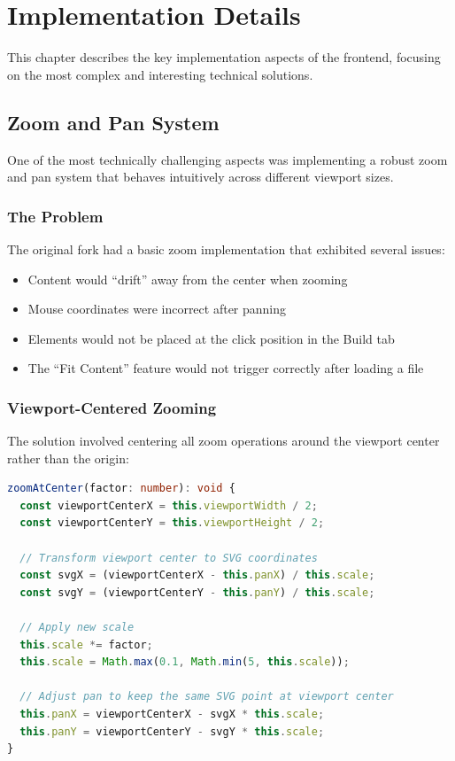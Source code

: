 \chapter{Implementation Details}
\label{chap:implementation}

This chapter describes the key implementation aspects of the frontend, focusing on the most complex and interesting technical solutions.

\section{Zoom and Pan System}
\label{sec:zoom-pan-system}

One of the most technically challenging aspects was implementing a robust zoom and pan system that behaves intuitively across different viewport sizes.

\subsection{The Problem}

The original fork had a basic zoom implementation that exhibited several issues:
\begin{itemize}
    \item Content would ``drift'' away from the center when zooming
    \item Mouse coordinates were incorrect after panning
    \item Elements would not be placed at the click position in the Build tab
    \item The ``Fit Content'' feature would not trigger correctly after loading a file
\end{itemize}

\subsection{Viewport-Centered Zooming}

The solution involved centering all zoom operations around the viewport center rather than the origin:

\begin{lstlisting}[language=TypeScript, caption={Viewport-centered zoom calculation}]
zoomAtCenter(factor: number): void {
  const viewportCenterX = this.viewportWidth / 2;
  const viewportCenterY = this.viewportHeight / 2;
  
  // Transform viewport center to SVG coordinates
  const svgX = (viewportCenterX - this.panX) / this.scale;
  const svgY = (viewportCenterY - this.panY) / this.scale;
  
  // Apply new scale
  this.scale *= factor;
  this.scale = Math.max(0.1, Math.min(5, this.scale));
  
  // Adjust pan to keep the same SVG point at viewport center
  this.panX = viewportCenterX - svgX * this.scale;
  this.panY = viewportCenterY - svgY * this.scale;
}
\end{lstlisting}

